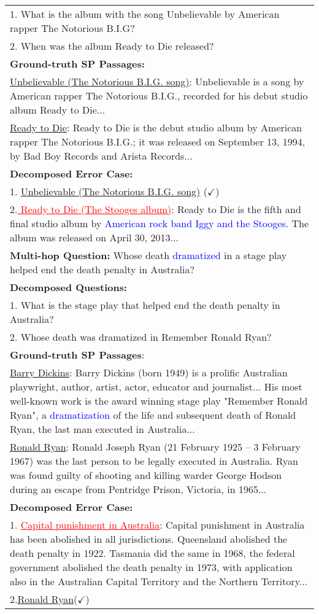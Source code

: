 \begin{table*}[h]
\begin{tabular}{p{}}
    1. What is the album with the song Unbelievable by American rapper The Notorious B.I.G?\\
    2. When was the album Ready to Die released? \\
    \textbf{Ground-truth SP Passages:} \\
    \underline{Unbelievable (The Notorious B.I.G. song)}: Unbelievable is a song by American rapper The Notorious B.I.G., recorded for his debut studio album Ready to Die... \\
    \underline{Ready to Die}: Ready to Die is the debut studio album by American rapper The Notorious B.I.G.; it was released on September 13, 1994, by Bad Boy Records and Arista Records... \\
    \textbf{Decomposed Error Case:} \\
    1. \underline{Unbelievable (The Notorious B.I.G. song)} ($	\checkmark$)\\
    2.\textcolor{red}{\underline{ Ready to Die (The Stooges album)}}: Ready to Die is the fifth and final studio album by \textcolor{blue}{American rock band Iggy and the Stooges}. The album was released on April 30, 2013...\\
    \midrule
    \textbf{Multi-hop Question:} Whose death \textcolor{blue}{dramatized} in a stage play helped end the death penalty in Australia? \\
    \textbf{Decomposed Questions:} \\
    1. What is the stage play that helped end the death penalty in Australia?\\
    2. Whose death was dramatized in Remember Ronald Ryan?\\
    \textbf{Ground-truth SP Passages}:\\
    \underline{Barry Dickins}: Barry Dickins (born 1949) is a prolific Australian playwright, author, artist, actor, educator and journalist... His most well-known work is the award winning stage play "Remember Ronald Ryan", a \textcolor{blue}{dramatization} of the life and subsequent death of Ronald Ryan, the last man executed in Australia...\\
    \underline{Ronald Ryan}: Ronald Joseph Ryan (21 February 1925 – 3 February 1967) was the last person to be legally executed in Australia. Ryan was found guilty of shooting and killing warder George Hodson during an escape from Pentridge Prison, Victoria, in 1965...\\
    \textbf{Decomposed Error Case:}\\
    1. \textcolor{red}{\underline{Capital punishment in Australia}}: Capital punishment in Australia has been abolished in all jurisdictions. Queensland abolished the death penalty in 1922. Tasmania did the same in 1968, the federal government abolished the death penalty in 1973, with application also in the Australian Capital Territory and the Northern Territory...\\
    2.\underline{Ronald Ryan}($\checkmark$)\\
    \bottomrule
    \end{tabular}
    \label{tab:decomposed_errors}
\end{table*}


